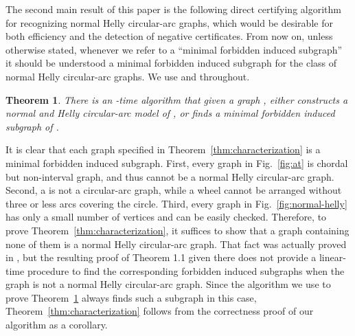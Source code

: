 \documentclass[10pt]{article}
\newtheorem{theorem}{Theorem}[section]
\newcommand{\nhcag}{normal Helly circular-arc graph}
\begin{document}
The second main result of this paper is the following direct
certifying algorithm for recognizing \nhcag s, which would be
desirable for both efficiency and the detection of negative
certificates.  From now on, unless otherwise stated, whenever we refer
to a ``minimal forbidden induced subgraph'' it should be understood a
minimal forbidden induced subgraph for the class of normal Helly
circular-arc graphs.  We use  and 
throughout.
\begin{theorem}\label{thm:certifying-algorithm}
  There is an -time algorithm that given a graph , either
  constructs a normal and Helly circular-arc model of , or finds a
  minimal forbidden induced subgraph of .
\end{theorem}

It is clear that each graph specified in
Theorem~\ref{thm:characterization} is a minimal forbidden induced
subgraph.  First, every graph in Fig.~\ref{fig:at} is chordal but
non-interval graph, and thus cannot be a \nhcag.  Second, a  is
not a circular-arc graph, while a wheel cannot be arranged without
three or less arcs covering the circle.  Third, every graph in
Fig.~\ref{fig:normal-helly} has only a small number of vertices and
can be easily checked.  Therefore, to prove
Theorem~\ref{thm:characterization}, it suffices to show that a graph
containing none of them is a \nhcag.  That fact was actually proved in
\cite{grippo-12-cag-without-dominating-triple}, but the resulting
proof of Theorem 1.1 given there does not provide a linear-time
procedure to find the corresponding forbidden induced subgraphs when
the graph is not a normal Helly circular-arc graph.  Since the
algorithm we use to prove Theorem~\ref{thm:certifying-algorithm}
always finds such a subgraph in this case,
Theorem~\ref{thm:characterization} follows from the correctness proof
of our algorithm as a corollary.
\end{document}
